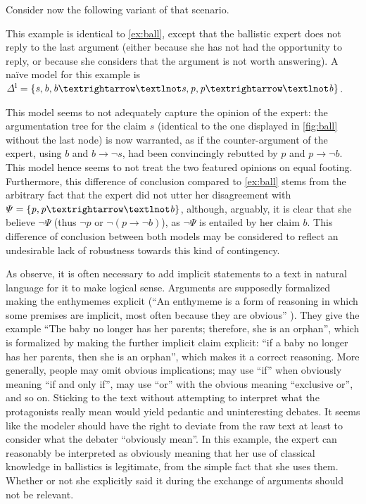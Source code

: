 \documentclass[version=3.21, pagesize, twoside=off, bibliography=totoc, DIV=calc, fontsize=12pt, a4paper, french, english]{scrartcl}
\begin{document}
Consider now the following variant of that scenario.
\begin{example}
	\label{ex:ball2}
	This example is identical to \cref{ex:ball}, except that the ballistic expert does not reply to the last argument (either because she has not had the opportunity to reply, or because she considers that the argument is not worth answering). A naïve model for this example is $\Delta^\text{l} = \set{\mathit{s},\allowbreak \mathit{b}, \mathit{b} → ¬\mathit{s}, \mathit{p}, \mathit{p} → ¬\mathit{b}}$.
\end{example}
This model seems to not adequately capture the opinion of the expert: the argumentation tree for the claim $\mathit{s}$ (identical to the one displayed in \cref{fig:ball} without the last node) is now warranted, as if the counter-argument of the expert, using $\mathit{b}$ and $\mathit{b} → ¬\mathit{s}$, had been convincingly rebutted by $\mathit{p}$ and $\mathit{p} → ¬\mathit{b}$. This model hence seems to not treat the two featured opinions on equal footing. Furthermore, this difference of conclusion compared to \cref{ex:ball} stems from the arbitrary fact that the expert did not utter her disagreement with $\Psi = \set{\mathit{p}, \mathit{p} → ¬\mathit{b}}$, although, arguably, it is clear that she believe $¬\Psi$ (thus $¬\mathit{p}$ or $¬(\mathit{p} → ¬\mathit{b})$), as $¬\Psi$ is entailed by her claim $\mathit{b}$. This difference of conclusion between both models may be considered to reflect an undesirable lack of robustness towards this kind of contingency.

As \citeauthor{besnard_elements_2000} observe, it is often necessary to add implicit statements to a text in natural language for it to make logical sense. 
Arguments are supposedly formalized making the enthymemes explicit (“An enthymeme is a form of reasoning in which some premises are implicit, most often because they are obvious” \citep[p.\ 41]{besnard_elements_2000}). They give the example “The baby no longer has her parents; therefore, she is an orphan”, which is formalized by making the further implicit claim explicit: “if a baby no longer has her parents, then she is an orphan”, which makes it a correct reasoning. 
More generally, people may omit obvious implications; may use “if” when obviously meaning “if and only if”, may use “or” with the obvious meaning “exclusive or”, and so on. Sticking to the text without attempting to interpret what the protagonists really mean would yield pedantic and uninteresting debates. It seems like the modeler should have the right to deviate from the raw text at least to consider what the debater “obviously mean”. In this example, the expert can reasonably be interpreted as obviously meaning that her use of classical knowledge in ballistics is legitimate, from the simple fact that she uses them. Whether or not she explicitly said it during the exchange of arguments should not be relevant.
\end{document}
